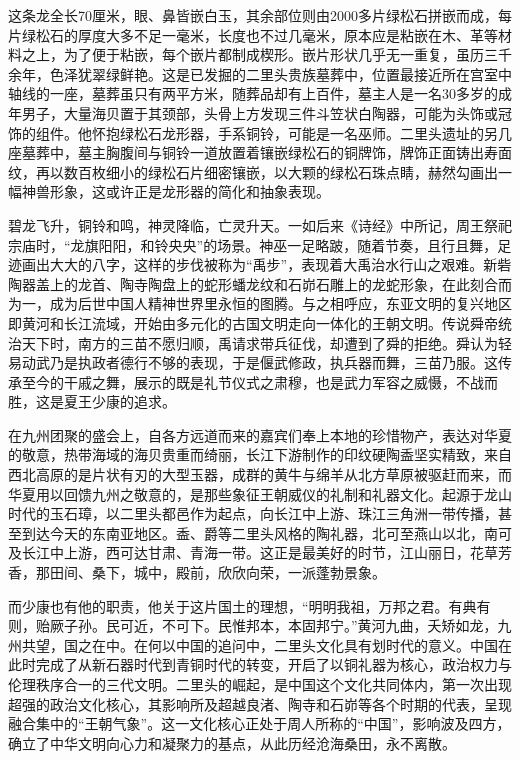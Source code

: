这条龙全长70厘米，眼、鼻皆嵌白玉，其余部位则由2000多片绿松石拼嵌而成，每片绿松石的厚度大多不足一毫米，长度也不过几毫米，原本应是粘嵌在木、革等材料之上，为了便于粘嵌，每个嵌片都制成楔形。嵌片形状几乎无一重复，虽历三千余年，色泽犹翠绿鲜艳。这是已发掘的二里头贵族墓葬中，位置最接近所在宫室中轴线的一座，墓葬虽只有两平方米，随葬品却有上百件，墓主人是一名30多岁的成年男子，大量海贝置于其颈部，头骨上方发现三件斗笠状白陶器，可能为头饰或冠饰的组件。他怀抱绿松石龙形器，手系铜铃，可能是一名巫师。二里头遗址的另几座墓葬中，墓主胸腹间与铜铃一道放置着镶嵌绿松石的铜牌饰，牌饰正面铸出寿面纹，再以数百枚细小的绿松石片细密镶嵌，以大颗的绿松石珠点睛，赫然勾画出一幅神兽形象，这或许正是龙形器的简化和抽象表现。

碧龙飞升，铜铃和鸣，神灵降临，亡灵升天。一如后来《诗经》中所记，周王祭祀宗庙时，“龙旗阳阳，和铃央央”的场景。神巫一足略跛，随着节奏，且行且舞，足迹画出大大的八字，这样的步伐被称为“禹步”，表现着大禹治水行山之艰难。新砦陶器盖上的龙首、陶寺陶盘上的蛇形蟠龙纹和石峁石雕上的龙蛇形象，在此刻合而为一，成为后世中国人精神世界里永恒的图腾。与之相呼应，东亚文明的复兴地区即黄河和长江流域，开始由多元化的古国文明走向一体化的王朝文明。传说舜帝统治天下时，南方的三苗不愿归顺，禹请求带兵征伐，却遭到了舜的拒绝。舜认为轻易动武乃是执政者德行不够的表现，于是偃武修政，执兵器而舞，三苗乃服。这传承至今的干戚之舞，展示的既是礼节仪式之肃穆，也是武力军容之威慑，不战而胜，这是夏王少康的追求。

在九州团聚的盛会上，自各方远道而来的嘉宾们奉上本地的珍惜物产，表达对华夏的敬意，热带海域的海贝贵重而绮丽，长江下游制作的印纹硬陶盉坚实精致，来自西北高原的是片状有刃的大型玉器，成群的黄牛与绵羊从北方草原被驱赶而来，而华夏用以回馈九州之敬意的，是那些象征王朝威仪的礼制和礼器文化。起源于龙山时代的玉石璋，以二里头都邑作为起点，向长江中上游、珠江三角洲一带传播，甚至到达今天的东南亚地区。盉、爵等二里头风格的陶礼器，北可至燕山以北，南可及长江中上游，西可达甘肃、青海一带。这正是最美好的时节，江山丽日，花草芳香，那田间、桑下，城中，殿前，欣欣向荣，一派蓬勃景象。

而少康也有他的职责，他关于这片国土的理想，“明明我祖，万邦之君。有典有则，贻厥子孙。民可近，不可下。民惟邦本，本固邦宁。”黄河九曲，夭矫如龙，九州共望，国之在中。在何以中国的追问中，二里头文化具有划时代的意义。中国在此时完成了从新石器时代到青铜时代的转变，开启了以铜礼器为核心，政治权力与伦理秩序合一的三代文明。二里头的崛起，是中国这个文化共同体内，第一次出现超强的政治文化核心，其影响所及超越良渚、陶寺和石峁等各个时期的代表，呈现融合集中的“王朝气象”。这一文化核心正处于周人所称的“中国”，影响波及四方，确立了中华文明向心力和凝聚力的基点，从此历经沧海桑田，永不离散。

